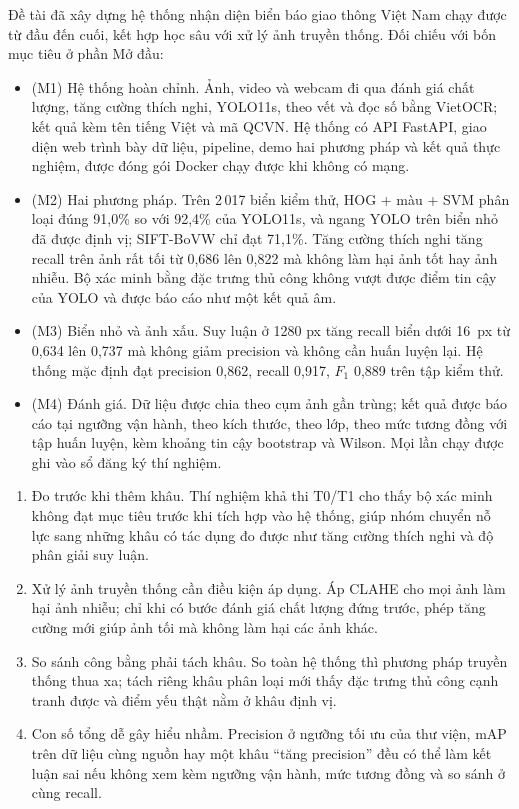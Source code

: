 \label{chap:conclusion}

\label{sec:accomplishments}

Đề tài đã xây dựng hệ thống nhận diện biển báo giao thông Việt Nam chạy được từ đầu đến cuối, kết hợp học sâu với xử lý ảnh truyền thống. Đối chiếu với bốn mục tiêu ở phần Mở đầu:
\begin{itemize}
 \item (M1) Hệ thống hoàn chỉnh. Ảnh, video và webcam đi qua đánh giá chất lượng, tăng cường thích nghi, YOLO11s, theo vết và đọc số bằng VietOCR; kết quả kèm tên tiếng Việt và mã QCVN. Hệ thống có API FastAPI, giao diện web trình bày dữ liệu, pipeline, demo hai phương pháp và kết quả thực nghiệm, được đóng gói Docker chạy được khi không có mạng.
 \item (M2) Hai phương pháp. Trên 2\,017 biển kiểm thử, HOG + màu + SVM phân loại đúng 91,0\% so với 92,4\% của YOLO11s, và ngang YOLO trên biển nhỏ đã được định vị; SIFT-BoVW chỉ đạt 71,1\%. Tăng cường thích nghi tăng recall trên ảnh rất tối từ 0,686 lên 0,822 mà không làm hại ảnh tốt hay ảnh nhiễu. Bộ xác minh bằng đặc trưng thủ công không vượt được điểm tin cậy của YOLO và được báo cáo như một kết quả âm.
 \item (M3) Biển nhỏ và ảnh xấu. Suy luận ở 1280 px tăng recall biển dưới 16~px từ 0,634 lên 0,737 mà không giảm precision và không cần huấn luyện lại. Hệ thống mặc định đạt precision 0,862, recall 0,917, $F_1$ 0,889 trên tập kiểm thử.
 \item (M4) Đánh giá. Dữ liệu được chia theo cụm ảnh gần trùng; kết quả được báo cáo tại ngưỡng vận hành, theo kích thước, theo lớp, theo mức tương đồng với tập huấn luyện, kèm khoảng tin cậy bootstrap và Wilson. Mọi lần chạy được ghi vào sổ đăng ký thí nghiệm.
\end{itemize}

\label{sec:lessons}

\begin{enumerate}
 \item Đo trước khi thêm khâu. Thí nghiệm khả thi T0/T1 cho thấy bộ xác minh không đạt mục tiêu trước khi tích hợp vào hệ thống, giúp nhóm chuyển nỗ lực sang những khâu có tác dụng đo được như tăng cường thích nghi và độ phân giải suy luận.
 \item Xử lý ảnh truyền thống cần điều kiện áp dụng. Áp CLAHE cho mọi ảnh làm hại ảnh nhiễu; chỉ khi có bước đánh giá chất lượng đứng trước, phép tăng cường mới giúp ảnh tối mà không làm hại các ảnh khác.
 \item So sánh công bằng phải tách khâu. So toàn hệ thống thì phương pháp truyền thống thua xa; tách riêng khâu phân loại mới thấy đặc trưng thủ công cạnh tranh được và điểm yếu thật nằm ở khâu định vị.
 \item Con số tổng dễ gây hiểu nhầm. Precision ở ngưỡng tối ưu của thư viện, mAP trên dữ liệu cùng nguồn hay một khâu ``tăng precision'' đều có thể làm kết luận sai nếu không xem kèm ngưỡng vận hành, mức tương đồng và so sánh ở cùng recall.
\end{enumerate}


